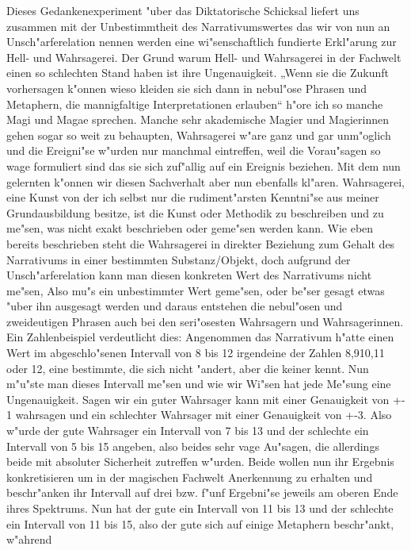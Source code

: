 \documentclass[a5paper,8pt]{book}
\begin{document}
Dieses Gedankenexperiment "uber das Diktatorische Schicksal liefert uns zusammen mit der Unbestimmtheit des Narrativumswertes das wir von nun an Unsch"arferelation nennen werden eine wi"senschaftlich fundierte Erkl"arung zur Hell- und Wahrsagerei. Der Grund warum Hell- und Wahrsagerei in der Fachwelt einen so schlechten Stand haben ist ihre Ungenauigkeit. „Wenn sie die Zukunft vorhersagen k"onnen wieso kleiden sie sich dann in nebul"ose Phrasen und Metaphern, die mannigfaltige Interpretationen erlauben“ h"ore ich so manche Magi und Magae sprechen. Manche sehr akademische Magier und Magierinnen gehen sogar so weit zu behaupten, Wahrsagerei w"are ganz und gar unm"oglich und die Ereigni"se w"urden nur manchmal eintreffen, weil die Vorau"sagen so wage formuliert sind das sie sich zuf"allig auf ein Ereignis beziehen. 
Mit dem nun gelernten k"onnen wir diesen Sachverhalt aber nun ebenfalls kl"aren. Wahrsagerei, eine Kunst von der ich selbst nur die rudiment"arsten Kenntni"se aus meiner Grundausbildung besitze, ist die Kunst oder Methodik zu beschreiben und zu me"sen, was nicht exakt beschrieben oder geme"sen werden kann. Wie eben bereits beschrieben steht die Wahrsagerei in direkter Beziehung zum Gehalt des Narrativums in einer bestimmten Substanz/Objekt, doch aufgrund der Unsch"arferelation kann man diesen konkreten Wert des Narrativums nicht me"sen, Also mu"s ein unbestimmter Wert geme"sen, oder be"ser gesagt etwas "uber ihn ausgesagt werden und daraus entstehen die nebul"osen und zweideutigen Phrasen auch bei den seri"osesten Wahrsagern und Wahrsagerinnen. 
Ein Zahlenbeispiel verdeutlicht dies: Angenommen das Narrativum h"atte einen Wert im abgeschlo"senen Intervall von 8 bis 12 irgendeine der Zahlen 8,910,11 oder 12, eine bestimmte, die sich nicht "andert, aber die keiner kennt. Nun m"u"ste man dieses Intervall me"sen und wie wir Wi"sen hat jede Me"sung eine Ungenauigkeit. Sagen wir ein guter Wahrsager kann mit einer Genauigkeit von +- 1 wahrsagen und ein schlechter Wahrsager mit einer Genauigkeit von +-3. Also w"urde der gute Wahrsager ein Intervall von 7 bis 13 und der schlechte ein Intervall von 5 bis 15 angeben, also beides sehr vage Au"sagen, die allerdings beide mit absoluter Sicherheit zutreffen w"urden. Beide wollen nun ihr Ergebnis konkretisieren um in der magischen Fachwelt Anerkennung zu erhalten und beschr"anken ihr Intervall auf drei bzw. f"unf Ergebni"se jeweils am oberen Ende ihres Spektrums. Nun hat der gute ein Intervall von 11 bis 13 und der schlechte ein Intervall von 11 bis 15, also der gute sich auf einige Metaphern beschr"ankt, w"ahrend 
\end{document}
